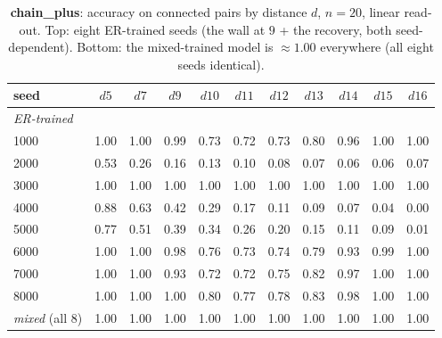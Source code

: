 \documentclass[11pt,a4paper]{article}
\begin{document}
\begin{table}[H]\centering\small
\begin{tabular}{lcccccccccc}
\toprule
seed & $d5$ & $d7$ & $d9$ & $d10$ & $d11$ & $d12$ & $d13$ & $d14$ & $d15$ & $d16$ \\
\midrule
\multicolumn{11}{l}{\emph{ER-trained}}\\
1000 & 1.00 & 1.00 & 0.99 & 0.73 & 0.72 & 0.73 & 0.80 & 0.96 & 1.00 & 1.00 \\
2000 & 0.53 & 0.26 & 0.16 & 0.13 & 0.10 & 0.08 & 0.07 & 0.06 & 0.06 & 0.07 \\
3000 & 1.00 & 1.00 & 1.00 & 1.00 & 1.00 & 1.00 & 1.00 & 1.00 & 1.00 & 1.00 \\
4000 & 0.88 & 0.63 & 0.42 & 0.29 & 0.17 & 0.11 & 0.09 & 0.07 & 0.04 & 0.00 \\
5000 & 0.77 & 0.51 & 0.39 & 0.34 & 0.26 & 0.20 & 0.15 & 0.11 & 0.09 & 0.01 \\
6000 & 1.00 & 1.00 & 0.98 & 0.76 & 0.73 & 0.74 & 0.79 & 0.93 & 0.99 & 1.00 \\
7000 & 1.00 & 1.00 & 0.93 & 0.72 & 0.72 & 0.75 & 0.82 & 0.97 & 1.00 & 1.00 \\
8000 & 1.00 & 1.00 & 1.00 & 0.80 & 0.77 & 0.78 & 0.83 & 0.98 & 1.00 & 1.00 \\
\midrule
\emph{mixed} (all 8) & 1.00 & 1.00 & 1.00 & 1.00 & 1.00 & 1.00 & 1.00 & 1.00 & 1.00 & 1.00 \\
\bottomrule\end{tabular}
\caption{\textbf{chain\_plus}: accuracy on connected pairs by distance $d$, $n=20$, linear
read-out. Top: eight ER-trained seeds (the wall at $9$ + the recovery, both seed-dependent).
Bottom: the mixed-trained model is $\approx1.00$ everywhere (all eight seeds identical).}
\label{tab:dist_chain_plus}
\end{table}
\end{document}
